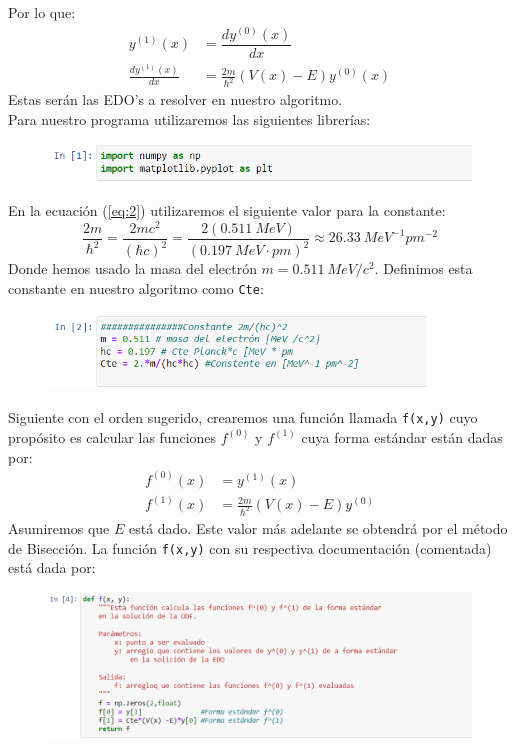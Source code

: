 \documentclass[11pt]{article}
\begin{document}
	Por lo que:
	\begin{align}
		y^{(1)}(x) &=  \dfrac{dy^{(0)}(x) }{dx}	\label{eq:1}\\
		\frac{dy^{(1)}(x)}{dx} &= \frac{2m}{\hbar^2} (V(x)-E) y^{(0)}(x)	 \label{eq:2}
	\end{align}
	Estas serán las EDO's a resolver en nuestro algoritmo.\\
	Para nuestro programa utilizaremos las siguientes librerías:
	\begin{figure}[h]
		\centering
		\includegraphics[width=13cm]{Img/2.1.PNG}
	\end{figure}

	En la ecuación (\ref{eq:2}) utilizaremos el siguiente valor para la constante:
	$$\frac{2m}{\hbar^2} = \frac{2mc^2}{(\hbar c)^2} =\frac{2(\SI{0.511}{MeV})}{(\SI{0.197}{MeV\cdot pm})^2}\approx \SI{26.33}{MeV^{-1}pm^{-2}}$$
	Donde hemos usado la masa del electrón $m = \SI{0.511}{MeV/c^2}$. Definimos esta constante en nuestro algoritmo como \texttt{Cte}:
	\begin{figure}[h]
		\centering
		\includegraphics[width=10cm]{Img/2.2.PNG}
	\end{figure}

	Siguiente con el orden sugerido, crearemos una función llamada \texttt{f(x,y)} cuyo propósito es calcular las funciones $f^{(0)}$ y $f^{(1)}$ cuya forma estándar están dadas por:
	\begin{align*}
		f^{(0)} (x) &= y^{(1)} (x)	\\
		f^{(1)} (x) &= \frac{2m}{\hbar^2} (V(x) - E) y^{(0)}
	\end{align*}
	Asumiremos que $E$ está dado. Este valor más adelante se obtendrá por el método de Bisección. La función \texttt{f(x,y)} con su respectiva documentación (comentada) está dada por:
\newpage
	\begin{figure}[h]
		\centering
		\includegraphics[width=13cm]{Img/2.3.PNG}
	\end{figure}
	
\end{document}
